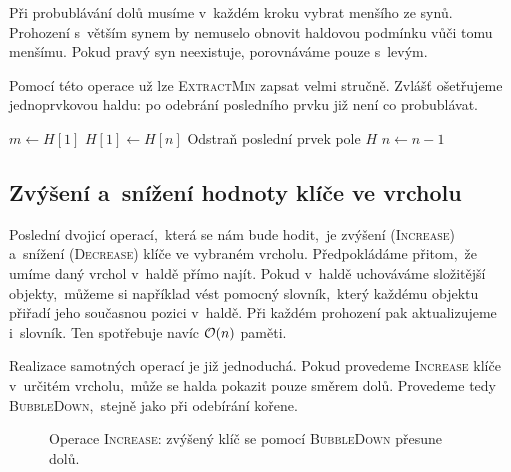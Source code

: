 Při probublávání dolů musíme v~každém kroku vybrat menšího ze synů. Prohození s~větším synem by nemuselo obnovit haldovou podmínku vůči tomu menšímu. Pokud pravý syn neexistuje, porovnáváme pouze s~levým.
\begin{algorithm}
    \caption{\textsc{bubble-down}}
    \label{alg:heap-bubble-down}
\end{algorithm}

Pomocí této operace už lze \textsc{ExtractMin} zapsat velmi stručně. Zvlášť ošetřujeme jednoprvkovou haldu: po odebrání posledního prvku již není co probublávat.
\begin{algorithm}
    \caption{\textsc{extract-min}}
    \label{alg:heap-extract-min}
    $m\gets H[1]$\;
    $H[1]\gets H[n]$\;
    Odstraň poslední prvek pole $H$\;
    $n\gets n-1$\;
    \;
\end{algorithm}

\subsection{Zvýšení a~snížení hodnoty klíče ve vrcholu}

Poslední dvojicí operací,~která se nám bude hodit,~je zvýšení (\textsc{Increase}) a~snížení (\textsc{Decrease}) klíče ve vybraném vrcholu. Předpokládáme přitom,~že umíme daný vrchol v~haldě přímo najít. Pokud v~haldě uchováváme složitější objekty,~můžeme si například vést pomocný slovník,~který každému objektu přiřadí jeho současnou pozici v~haldě. Při každém prohození pak aktualizujeme i~slovník. Ten spotřebuje navíc $\mathcal{O}(n)$ paměti.

Realizace samotných operací je již jednoduchá. Pokud provedeme \textsc{Increase} klíče v~určitém vrcholu,~může se halda pokazit pouze směrem dolů. Provedeme tedy \textsc{BubbleDown},~stejně jako při odebírání kořene.

\begin{figure}[ht]
    \centering
    
    \caption{Operace \textsc{Increase}: zvýšený klíč se pomocí \textsc{BubbleDown} přesune dolů.}
    \label{fig:halda-increase}
\end{figure}

